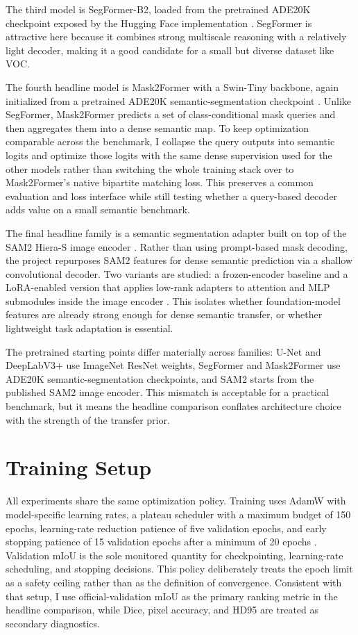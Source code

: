 \documentclass{article}
\begin{document}
The third model is SegFormer-B2, loaded from the pretrained ADE20K checkpoint exposed by the Hugging Face implementation \citep{xie2021segformer}. SegFormer is attractive here because it combines strong multiscale reasoning with a relatively light decoder, making it a good candidate for a small but diverse dataset like VOC.

The fourth headline model is Mask2Former with a Swin-Tiny backbone, again initialized from a pretrained ADE20K semantic-segmentation checkpoint \citep{cheng2022masked}. Unlike SegFormer, Mask2Former predicts a set of class-conditional mask queries and then aggregates them into a dense semantic map. To keep optimization comparable across the benchmark, I collapse the query outputs into semantic logits and optimize those logits with the same dense supervision used for the other models rather than switching the whole training stack over to Mask2Former's native bipartite matching loss. This preserves a common evaluation and loss interface while still testing whether a query-based decoder adds value on a small semantic benchmark.

The final headline family is a semantic segmentation adapter built on top of the SAM2 Hiera-S image encoder \citep{ravi2024sam2}. Rather than using prompt-based mask decoding, the project repurposes SAM2 features for dense semantic prediction via a shallow convolutional decoder. Two variants are studied: a frozen-encoder baseline and a LoRA-enabled version that applies low-rank adapters to attention and MLP submodules inside the image encoder \citep{hu2022lora}. This isolates whether foundation-model features are already strong enough for dense semantic transfer, or whether lightweight task adaptation is essential.

The pretrained starting points differ materially across families: U-Net and DeepLabV3+ use ImageNet ResNet weights, SegFormer and Mask2Former use ADE20K semantic-segmentation checkpoints, and SAM2 starts from the published SAM2 image encoder. This mismatch is acceptable for a practical benchmark, but it means the headline comparison conflates architecture choice with the strength of the transfer prior.

\section{Training Setup}

All experiments share the same optimization policy. Training uses AdamW with model-specific learning rates, a plateau scheduler with a maximum budget of 150 epochs, learning-rate reduction patience of five validation epochs, and early stopping patience of 15 validation epochs after a minimum of 20 epochs \citep{loshchilov2019decoupled}. Validation mIoU is the sole monitored quantity for checkpointing, learning-rate scheduling, and stopping decisions. This policy deliberately treats the epoch limit as a safety ceiling rather than as the definition of convergence. Consistent with that setup, I use official-validation mIoU as the primary ranking metric in the headline comparison, while Dice, pixel accuracy, and HD95 are treated as secondary diagnostics.
\end{document}
